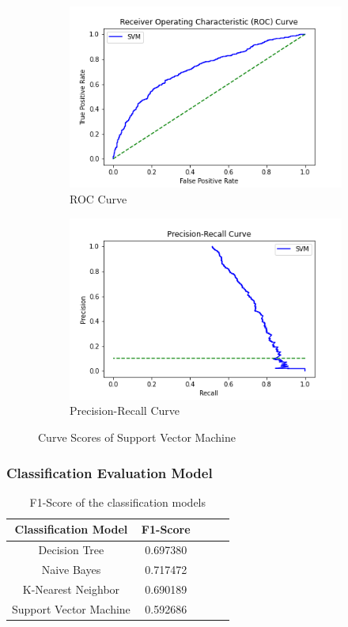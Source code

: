 \documentclass[11pt]{article}
\begin{document}
\begin{figure}[ht]
\begin{subfigure}{0.5\textwidth}
\includegraphics[scale=0.45]{roc_svm.png} 
\caption{ROC Curve}
\label{fig:rocSVM}
\end{subfigure}
\begin{subfigure}{0.5\textwidth}
\includegraphics[scale=0.45]{prs_svm.png}
\caption{Precision-Recall Curve}
\label{fig:prsSVM}
\end{subfigure}
\label{fig:csSVM}
\caption{Curve Scores of Support Vector Machine}
\end{figure}

\clearpage
\subsubsection{Classification Evaluation Model}
\begin{table}[ht]
\centering
\caption{\label{tab:f1Metrics}F1-Score of the classification models}
\begin{adjustbox}{width=.5\textwidth}
\begin{tabular}{|c|c|c|c|c|}
\hline
\textbf{Classification Model} & \textbf{F1-Score}\\ \hline
Decision Tree & 0.697380 \\ \hline
Naive Bayes & 0.717472 \\ \hline
K-Nearest Neighbor & 0.690189 \\ \hline
Support Vector Machine & 0.592686\\ \hline
\end{tabular}
\end{adjustbox}
\end{table}
\end{document}
